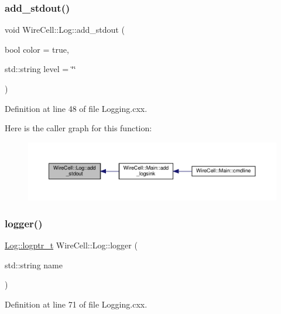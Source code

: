 \subsubsection{\texorpdfstring{add\+\_\+stdout()}{add\_stdout()}}
{\footnotesize\ttfamily void Wire\+Cell\+::\+Log\+::add\+\_\+stdout (\begin{DoxyParamCaption}\item[{bool}]{color = {\ttfamily true},  }\item[{std\+::string}]{level = {\ttfamily \char`\"{}\char`\"{}} }\end{DoxyParamCaption})}



Definition at line 48 of file Logging.\+cxx.

Here is the caller graph for this function\+:
\nopagebreak
\begin{figure}[H]
\begin{center}
\leavevmode
\includegraphics[width=350pt]{namespace_wire_cell_1_1_log_a417843ceafbe08958ee4d72acf1732d0_icgraph}
\end{center}
\end{figure}
\mbox{\label{namespace_wire_cell_1_1_log_a7675bcc4bf25b2bc66314d5c096cf676}} 
\subsubsection{\texorpdfstring{logger()}{logger()}}
{\footnotesize\ttfamily \hyperlink{namespace_wire_cell_1_1_log_a5147137d4bcdf4d35c235c5c1ec1495f}{Log\+::logptr\+\_\+t} Wire\+Cell\+::\+Log\+::logger (\begin{DoxyParamCaption}\item[{std\+::string}]{name }\end{DoxyParamCaption})}



Definition at line 71 of file Logging.\+cxx.

